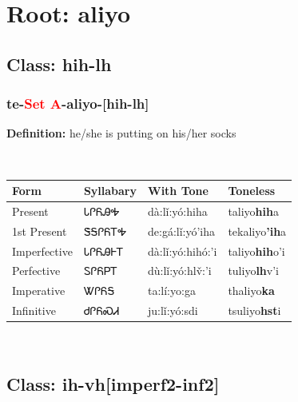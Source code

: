 \needspace{4in}
\section*{Root: aliyo}
\nopagebreak
{}
\needspace{3in}
\subsection*{Class: hih-lh}
\nopagebreak
\needspace{2in}
\subsubsection*{te{-}\textcolor{Red}{Set A}{-}\textbf{aliyo}{-}[hih-lh]}
\nopagebreak
\textbf{Definition: } he/she is putting on his/her socks
\\[0.5em]
\begin{tabularx}{\textwidth}{l X X X}%
\toprule%
\textbf{Form}&\textbf{Syllabary}&\textbf{With Tone}&\textbf{Toneless}\\%
\midrule%
Present&ᏓᎵᏲᎯᎭ&dà:lǐ:yó:hiha&taliyo\textbf{hih}a\\%
1st Present&ᏕᎦᎵᏲᎢᎭ&de:gá:lǐ:yó’iha&tekaliyo\textbf{'ih}a\\%
Imperfective&ᏓᎵᏲᎯᎰᎢ&dà:lǐ:yó:hihó:’i&taliyo\textbf{hih}o'i\\%
Perfective&ᏚᎵᏲᏢᎢ&dù:lǐ:yó:hlv̌:’i&tuliyo\textbf{lh}v'i\\%
Imperative&ᏔᎵᏲᎦ&ta:lí:yo:ga&thaliyo\textbf{ka}\\%
Infinitive&ᏧᎵᏲᏍᏗ&ju:lǐ:yó:sdi&tsuliyo\textbf{hst}i\\%
\bottomrule%
\end{tabularx}
\\[1em]
\needspace{3in}
\subsection*{Class: ih-vh[imperf2-inf2]}
\nopagebreak
\needspace{2in}
